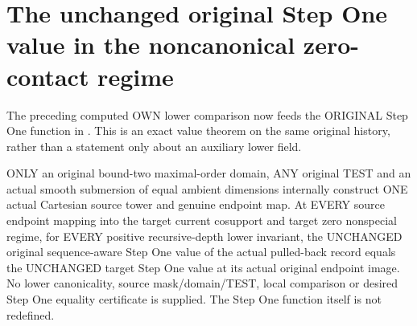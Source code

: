 \section{The unchanged original Step One value in the noncanonical zero-contact regime}

The preceding computed OWN lower comparison now feeds the ORIGINAL
Step One function in \cite[Section~5, Step~I.B]{bierstone-milman08-functoriality}.
This is an exact value theorem on the same original history, rather than
a statement only about an auxiliary lower field.

\begin{theorem}
\label{hir:original-only-any-test-zero-stepone-etale-values}
\leanok
ONLY an original bound-two maximal-order domain, ANY original TEST and
an actual smooth submersion of equal ambient dimensions internally
construct ONE actual Cartesian source tower and genuine endpoint map.
At EVERY source endpoint mapping into the target current cosupport
and target zero nonspecial regime, for EVERY positive recursive-depth
lower invariant, the UNCHANGED original sequence-aware Step One value
of the actual pulled-back record equals the UNCHANGED target Step One
value at its actual original endpoint image. No lower canonicality,
source mask/domain/TEST, local comparison or desired Step One equality
certificate is supplied. The Step One function itself is not redefined.
\end{theorem}

